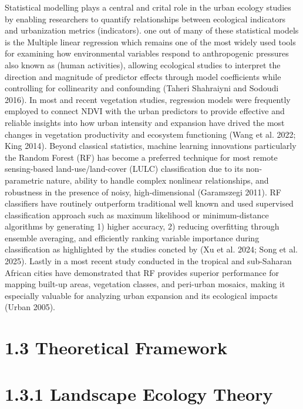 Statistical modelling plays a central and crital role in the urban ecology studies by enabling researchers to quantify relationships between ecological indicators and urbanization metrics (indicators). one out of many of these statistical models is the Multiple linear regression which remains one of the most widely used tools for examining how environmental variables respond to anthropogenic pressures also known as (human activities), allowing ecological studies to interpret the direction and magnitude of predictor effects through model coefficients while controlling for collinearity and confounding (Taheri Shahraiyni and Sodoudi 2016). In most and recent vegetation studies, regression models were frequently employed to connect NDVI with the urban predictors to provide effective and reliable insights into how urban intensity and expansion have drived the most changes in vegetation productivity and ecosystem functioning (Wang et al. 2022; King 2014). Beyond classical statistics, machine learning innovations particularly the Random Forest (RF) has become a preferred technique for most remote sensing-based land-use/land-cover (LULC) classification due to its non-parametric nature, ability to handle complex nonlinear relationships, and robustness in the presence of noisy, high-dimensional (Garamszegi 2011). RF classifiers have routinely outperform traditional well known and used supervised classification approach such as maximum likelihood or minimum-distance algorithms by generating 1) higher accuracy, 2) reducing overfitting through ensemble averaging, and efficiently ranking variable importance during classification as highlighted by the studies concted by (Xu et al. 2024; Song et al. 2025). Lastly in a most recent study conducted in the tropical and sub-Saharan African cities have demonstrated that RF provides superior performance for mapping built-up areas, vegetation classes, and peri-urban mosaics, making it especially valuable for analyzing urban expansion and its ecological impacts (Urban 2005).
\hypertarget{theoretical-framework}{%
\section{\texorpdfstring{\textbf{1.3 Theoretical Framework}}{1.3 Theoretical Framework}}\label{theoretical-framework}}

\hypertarget{landscape-ecology-theory}{%
\section{\texorpdfstring{\textbf{1.3.1 Landscape Ecology Theory}}{1.3.1 Landscape Ecology Theory}}\label{landscape-ecology-theory}}


